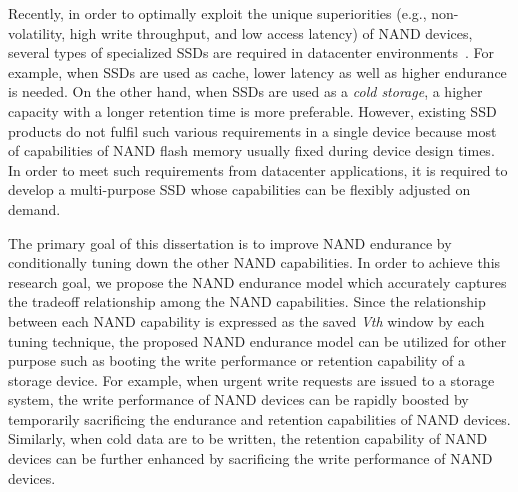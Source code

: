 Recently, in order to optimally exploit the unique superiorities (e.g., non-volatility, high write throughput, and low access latency) of NAND devices, several types of specialized SSDs are required in datacenter environments~\cite{Flash_Facebook}.
For example, when SSDs are used as cache, lower latency as well as higher endurance is needed.
On the other hand, when SSDs are used as a {\it cold storage}, a higher capacity with a longer retention time is more preferable.
However, existing SSD products do not fulfil such various requirements in a single device because most of capabilities of NAND flash memory usually fixed during device design times.
In order to meet such requirements from datacenter applications, it is required to develop a multi-purpose SSD whose capabilities can be flexibly adjusted on demand.


The primary goal of this dissertation is to improve NAND endurance by conditionally tuning down the other NAND capabilities.
In order to achieve this research goal, we propose the NAND endurance model which accurately captures the tradeoff relationship among the NAND capabilities.
Since the relationship between each NAND capability is expressed as the saved \textit{Vth} window by each tuning technique, the proposed NAND endurance model can be utilized for other purpose such as booting the write performance or retention capability of a storage device.
For example, when urgent write requests are issued to a storage system, the write performance of NAND devices can be rapidly boosted by temporarily sacrificing the endurance and retention capabilities of NAND devices.
Similarly, when cold data are to be written, the retention capability of NAND devices can be further enhanced by sacrificing the write performance of NAND devices.





